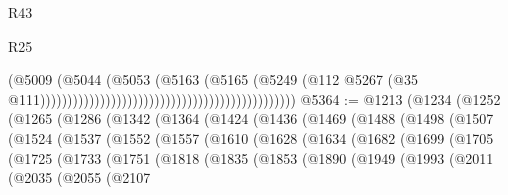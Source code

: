 \begin{lexlean}{R43}
\begin{lexlean}{R25}
\begin{coremodule}
{{{{{{{{{{{{{{{{{{{{{{{{{{{{{{{{{{{{{{{{{{{{{{{{{{{{{{{{{{{{{{{{{{{{{{{{{{{{{{{{{{{{{{{{{{{{{{{{{{{{{{{{{{{{{{{{{{{{{{{{{{{{{{{{{{{{{{{{{{{{{{{{{{{{{{{{{{{{{{{{{{{{{{{{{{{{{{{{{{{{{{{{{{{{{{{{{                                                                                  (@5009
                                                                                    (@5044
                                                                                      (@5053
                                                                                        (@5163
                                                                                          (@5165
                                                                                            (@5249
                                                                                              (@112
                                                                                                @5267
                                                                                                (@35
                                                                                                  @111)))))))))))))))))))))))))))))))))))))))))))))))
@5364 := @1213
    (@1234
      (@1252
        (@1265
          (@1286
            (@1342
              (@1364
                (@1424
                  (@1436
                    (@1469
                      (@1488
                        (@1498
                          (@1507
                            (@1524
                              (@1537
                                (@1552
                                  (@1557
                                    (@1610
                                      (@1628
                                        (@1634
                                          (@1682
                                            (@1699
                                              (@1705
                                                (@1725
                                                  (@1733
                                                    (@1751
                                                      (@1818
                                                        (@1835
                                                          (@1853
                                                            (@1890
                                                              (@1949
                                                                (@1993
                                                                  (@2011
                                                                    (@2035
                                                                      (@2055
                                                                        (@2107
}}}}}}}}}}}}}}}}}}}}}}}}}}}}}}}}}}}}}}}}}}}}}}}}}}}}}}}}}}}}}}}}}}}}}}}}}}}}}}}}}}}}}}}}}}}}}}}}}}}}}}}}}}}}}}}}}}}}}}}}}}}}}}}}}}}}}}}}}}}}}}}}}}}}}}}}}}}}}}}}}}}}}}}}}}}}}}}}}}}}}}}}}}}}}}}}}
\end{coremodule}
\end{lexlean}
\end{lexlean}
